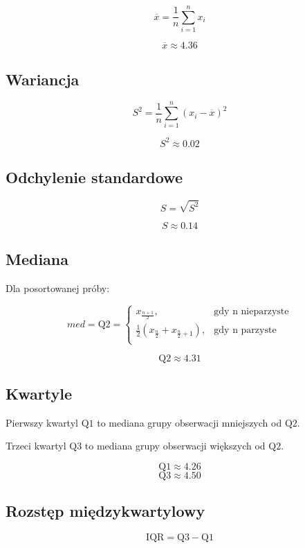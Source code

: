 \documentclass[fleqn]{article}
\theoremstyle{plain}
\begin{document}
    $$\overline{x} = \frac{1}{n} \sum_{i=1}^{n} x_{i}$$

    $$\overline{x} \approx 4.36$$

    \subsection{Wariancja}

    $$S^2 = \frac{1}{n} \sum_{i=1}^n\left(x_i - \overline{x}\right)^2$$ 

    $$S^2 \approx 0.02$$

    \subsection{Odchylenie standardowe}

    $$S = \sqrt{S^2}$$ 

    $$S \approx 0.14$$

    \subsection{Mediana}

    Dla posortowanej próby:

    $$med = \text{Q}2 = \begin{cases}
        x_{\frac{n+1}{2}}, & \text{gdy n nieparzyste}\\
        \frac{1}{2}\left(x_{\frac{n}{2}} + x_{\frac{n}{2}+1}\right), & \text{gdy n parzyste}\\
        \end{cases}$$

    $$\text{Q}2 \approx 4.31$$

    \subsection{Kwartyle}

    Pierwszy kwartyl $\text{Q}1$ to mediana grupy obserwacji mniejszych od $\text{Q}2$.

    \noindent Trzeci kwartyl $\text{Q}3$ to mediana grupy obserwacji większych od $\text{Q}2$.

    $$\text{Q}1 \approx 4.26$$
    $$\text{Q}3 \approx 4.50$$

    \subsection{Rozstęp międzykwartylowy}

    $$\text{IQR} = \text{Q}3 - \text{Q}1$$ 
\end{document}
